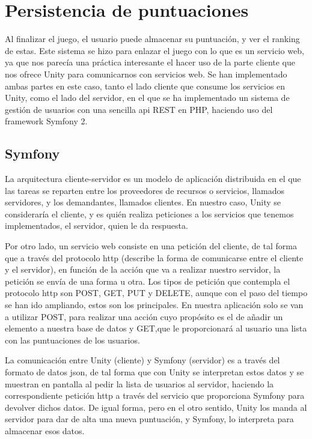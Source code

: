 \section{Persistencia de puntuaciones}
\label{cap4:sec:puntuaciones}

Al finalizar el juego, el usuario puede almacenar su puntuación, y ver el ranking de estas. Este sistema se hizo para enlazar el juego con lo que es un servicio web, ya que nos parecía una práctica interesante el hacer uso de la parte cliente que nos ofrece Unity para comunicarnos con servicios web. Se han implementado ambas partes en este caso, tanto el lado cliente que consume los servicios en Unity, como el lado del servidor, en el que se ha implementado un sistema de gestión de usuarios con una sencilla api REST en PHP, haciendo uso del framework Symfony 2.

\subsection{Symfony}
\label{cap4:sub:symfony}

La arquitectura cliente-servidor es un modelo de aplicación distribuida en el que las tareas se reparten entre los proveedores de recursos o servicios, llamados servidores, y los demandantes, llamados clientes. En nuestro caso, Unity se consideraría el cliente, y es quién realiza peticiones a los servicios que tenemos implementados, el servidor, quien le da respuesta.

Por otro lado, un servicio web consiste en una petición del cliente, de tal forma que a través del protocolo http (describe la forma de comunicarse entre el cliente y el servidor), en función de la acción que va a realizar nuestro servidor, la petición se envía de una forma u otra. Los tipos de petición que contempla el protocolo http son POST, GET, PUT y DELETE, aunque con el paso del tiempo se han ido ampliando, estos son los principales. En nuestra aplicación solo se van a utilizar POST, para realizar una acción cuyo propósito es el de añadir un elemento a nuestra base de datos y GET,que le proporcionará al usuario una lista con las puntuaciones de los usuarios.

La comunicación entre Unity (cliente) y Symfony (servidor) es a través del formato de datos json, de tal forma que con Unity se interpretan estos datos y se muestran en pantalla al pedir la lista de usuarios al servidor, haciendo la correspondiente petición http a través del servicio que proporciona Symfony para devolver dichos datos. De igual forma, pero en el otro sentido, Unity los manda al servidor para dar de alta una nueva puntuación, y Symfony, lo interpreta para almacenar esos datos.

